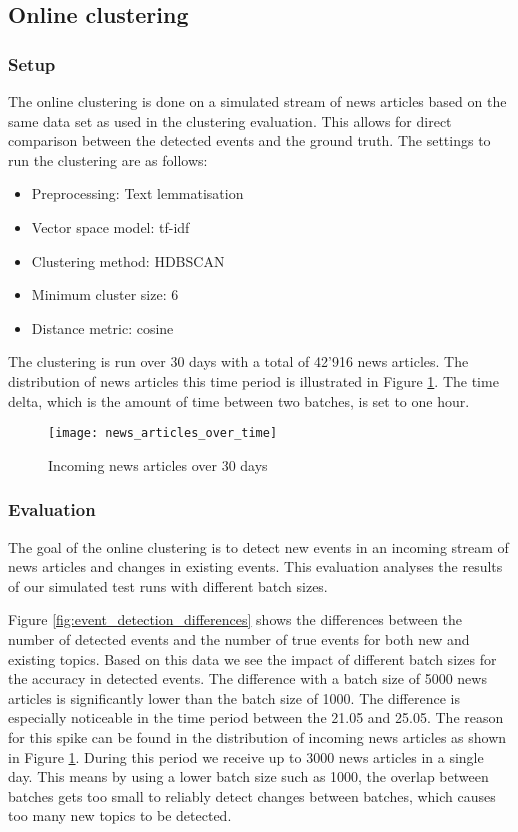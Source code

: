 \subsection{Online clustering}

\subsubsection{Setup}

The online clustering is done on a simulated stream of news articles based on the same data set as used in the clustering evaluation. This allows for direct comparison between the detected events and the ground truth. The settings to run the clustering are as follows:

\begin{itemize}
    \item Preprocessing: Text lemmatisation
    \item Vector space model: tf-idf
    \item Clustering method: HDBSCAN
    \item Minimum cluster size: 6
    \item Distance metric: cosine
\end{itemize}

The clustering is run over 30 days with a total of 42'916 news articles. The distribution of news articles this time period is illustrated in Figure \ref{fig:news_articles_over_time}. The time delta, which is the amount of time between two batches, is set to one hour. 

\begin{figure}[h]
    \centering
    \texttt{[image: news\_articles\_over\_time]}
    \caption{Incoming news articles over 30 days}
    \label{fig:news_articles_over_time}
\end{figure}

\subsubsection{Evaluation}

The goal of the online clustering is to detect new events in an incoming stream of news articles and changes in existing events. This evaluation analyses the results of our simulated test runs with different batch sizes.

Figure \ref{fig:event_detection_differences} shows the differences between the number of detected events and the number of true events for both new and existing topics. Based on this data we see the impact of different batch sizes for the accuracy in detected events. The difference with a batch size of 5000 news articles is significantly lower than the batch size of 1000. The difference is especially noticeable in the time period between the 21.05 and 25.05. The reason for this spike can be found in the distribution of incoming news articles as shown in Figure \ref{fig:news_articles_over_time}. During this period we receive up to 3000 news articles in a single day. This means by using a lower batch size such as 1000, the overlap between batches gets too small to reliably detect changes between batches, which causes too many new topics to be detected. 

